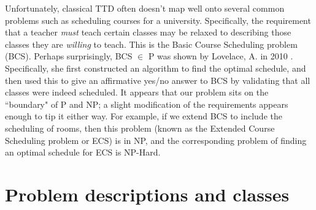 \documentclass[]{article}
\theoremstyle{definition}
\theoremstyle{remark}
\numberwithin{equation}{section}
\begin{document}
Unfortunately, classical TTD often doesn't map well onto several common problems such as scheduling courses for a university. Specifically, the requirement that a teacher \emph{must} teach certain classes may be relaxed to describing those classes they are \emph{willing} to teach. This is the Basic Course Scheduling problem (BCS). Perhaps surprisingly, BCS $\in$ P was shown by Lovelace, A. in 2010 \cite{lovelace2010}. Specifically, she first constructed an algorithm to find the optimal schedule, and then used this to give an affirmative yes/no answer to BCS by validating that all classes were indeed scheduled. It appears that our problem sits on the ``boundary" of P and NP; a slight modification of the requirements appears enough to tip it either way. For example, if we extend BCS to include the scheduling of rooms, then this problem (known as the Extended Course Scheduling problem or ECS) is in NP, and the corresponding problem of finding an optimal schedule for ECS is NP-Hard.

\section{Problem descriptions and classes}
\end{document}
